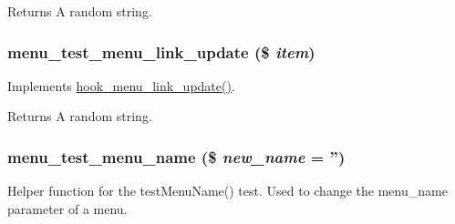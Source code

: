 \begin{DoxyReturn}{Returns}
A random string. 
\end{DoxyReturn}
\hypertarget{menu__test_8module_a6caecf7a35531a40a3eb68bc89e45027}{
\subsubsection[{menu\_\-test\_\-menu\_\-link\_\-update}]{\setlength{\rightskip}{0pt plus 5cm}menu\_\-test\_\-menu\_\-link\_\-update (\$ {\em item})}}
\label{menu__test_8module_a6caecf7a35531a40a3eb68bc89e45027}
Implements \hyperlink{group__hooks_gafd2d5cc2a49cf37a637201eb76a41d1d}{hook\_\-menu\_\-link\_\-update()}.

\begin{DoxyReturn}{Returns}
A random string. 
\end{DoxyReturn}
\hypertarget{menu__test_8module_abf98a6c14bcd2e2ff048374cedfa3abd}{
\subsubsection[{menu\_\-test\_\-menu\_\-name}]{\setlength{\rightskip}{0pt plus 5cm}menu\_\-test\_\-menu\_\-name (\$ {\em new\_\-name} = {\ttfamily ''})}}
\label{menu__test_8module_abf98a6c14bcd2e2ff048374cedfa3abd}
Helper function for the testMenuName() test. Used to change the menu\_\-name parameter of a menu.


